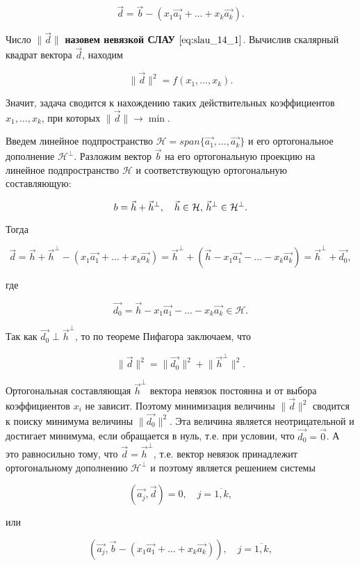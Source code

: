$$\vec{d} = \vec{b} - (x_1\vec{a_1} + \ldots + x_k\vec{a_k}).$$

Число $\lVert \vec{d} \rVert$ \textbf{назовем невязкой СЛАУ} $\eqref{eq:slau_14_1}$. Вычислив скалярный квадрат вектора $\vec{d}$, находим

$$\lVert \vec{d} \rVert^2 = f(x_1, \ldots, x_k).$$

Значит, задача сводится к нахождению таких действительных коэффициентов $x_1, \ldots, x_k$, при которых $\lVert \vec{d} \rVert \to \min$.

Введем линейное подпространство $\mathcal{H} = span\{\vec{a_1}, \ldots, \vec{a_k}\}$ и его ортогональное дополнение $\mathcal{H}^\perp$. Разложим вектор $\vec{b}$ на его ортогональную проекцию на линейное подпространство $\mathcal{H}$ и соответствующую ортогональную составляющую:

$$b = \vec{h} + \vec{h}^\perp, \quad \vec{h} \in \mathcal{H}, \thinspace \vec{h}^\perp \in \mathcal{H}^\perp.$$

Тогда

$$\vec{d} = \vec{h} + \vec{h}^\perp - (x_1\vec{a_1} + \ldots + x_k\vec{a_k}) = \vec{h}^\perp + (\vec{h} - x_1\vec{a_1} - \ldots - x_k\vec{a_k}) = \vec{h}^\perp + \vec{d_0},$$

где

$$\vec{d_0} = \vec{h} - x_1\vec{a_1} - \ldots - x_k\vec{a_k} \in \mathcal{H}.$$

Так как $\vec{d_0} \perp \vec{h}^\perp$, то по теореме Пифагора заключаем, что

$$\lVert \vec{d} \rVert^2 = \lVert \vec{d_0} \rVert^2 + \lVert \vec{h}^\perp \rVert^2.$$

Ортогональная составляющая $\vec{h}^\perp$ вектора невязок постоянна и от выбора коэффициентов $x_i$ не зависит. Поэтому минимизация величины $\lVert \vec{d} \rVert^2$ сводится к поиску минимума величины $\lVert \vec{d_0} \rVert^2$. Эта величина является неотрицательной и достигает минимума, если обращается в нуль, т.е. при условии, что $\vec{d_0} = \vec{0}$. А это равносильно тому, что $\vec{d} = \vec{h}^\perp$, т.е. вектор невязок принадлежит ортогональному дополнению $\mathcal{H}^\perp$ и поэтому является решением системы

\begin{equation}
    (\vec{a_j}, \vec{d}) = 0, \quad j = \overline{1, k},
    \label{eq:slau_14_2}
\end{equation}

или

$$(\vec{a_j}, \vec{b} - (x_1\vec{a_1} + \ldots + x_k\vec{a_k})), \quad j = \overline{1, k},$$

